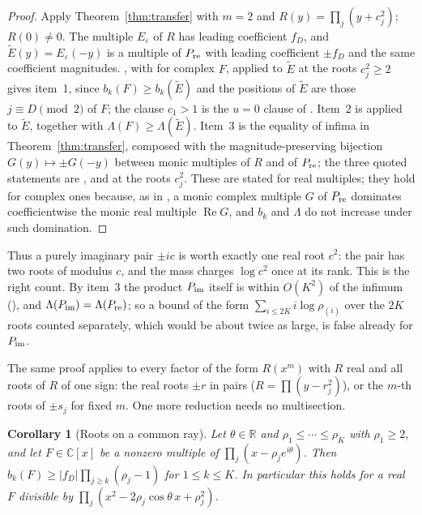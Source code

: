 \documentclass[11pt]{article}
\newtheorem{corollary}[theorem]{Corollary}
\newcommand{\R}{\mathbb R}
\begin{document}
\begin{proof}
Apply Theorem~\ref{thm:transfer} with $m=2$ and $R(y)=\prod_j(y+c_j^2)$;
$R(0)\ne0$.  The multiple $E_\varepsilon$ of $R$ has leading coefficient
$f_D$, and $\tilde E(y)=E_\varepsilon(-y)$ is a multiple of $P_{\rm re}$
with leading coefficient $\pm f_D$ and the same coefficient magnitudes.  \cite[Theorem~3.2]{coefficient-mass}, with \cite[Corollary~3.3]{coefficient-mass} for complex $F$, applied to
$\tilde E$ at the roots $c_j^2\ge2$ gives item~1, since
$b_k(F)\ge b_k(\tilde E)$ and the positions of $\tilde E$ are those
$j\equiv D\pmod 2$ of $F$; the clause $c_1>1$ is the $u=0$ clause of
\cite[Theorem~3.2]{coefficient-mass}.  Item~2 is \cite[Corollary~3.4]{coefficient-mass} applied to $\tilde E$, together with
$\Lambda(F)\ge\Lambda(\tilde E)$.  Item~3 is the equality of infima in
Theorem~\ref{thm:transfer}, composed with the magnitude-preserving
bijection $G(y)\mapsto\pm G(-y)$ between monic multiples of $R$ and of
$P_{\rm re}$; the three quoted statements are \cite[Corollary~4.3]{coefficient-mass},
\cite[Proposition~4.2]{coefficient-mass} and \cite[Proposition~4.4]{coefficient-mass} at
the roots $c_j^2$.  These are stated for real multiples; they hold for complex
ones because, as in \cite[Corollary~3.3]{coefficient-mass}, a monic complex
multiple $G$ of $P_{\rm re}$ dominates coefficientwise the monic real multiple
$\operatorname{Re}G$, and $b_k$ and $\Lambda$ do not increase under such
domination.
\end{proof}

Thus a purely imaginary pair $\pm ic$ is worth exactly one real root $c^2$:
the pair has two roots of modulus $c$, and the mass charges $\log c^2$ once
at its rank.  This is the right count.  By item~3 the product
$P_{\rm im}$ itself is within $O(K^2)$ of the infimum
(\cite[Corollary~3.7]{coefficient-mass}), and $\Lambda(P_{\rm im})=\Lambda(P_{\rm re})$; so a
bound of the form $\sum_{i\le2K}i\log\rho_{(i)}$ over the $2K$ roots
counted separately, which would be about twice as large, is false already
for $P_{\rm im}$.

The same proof applies to every factor of the form $R(x^m)$ with $R$ real
and all roots of $R$ of one sign: the real roots $\pm r$ in pairs
($R=\prod(y-r_j^2)$), or the $m$-th roots of $\pm s_j$ for fixed $m$.  One
more reduction needs no multisection.

\begin{corollary}[Roots on a common ray]\label{cor:ray}
Let $\theta\in\R$ and $\rho_1\le\cdots\le\rho_K$ with $\rho_1\ge2$, and let
$F\in\mathbb C[x]$ be a nonzero multiple of $\prod_j(x-\rho_je^{i\theta})$.  Then
$b_k(F)\ge|f_D|\prod_{j\ge k}(\rho_j-1)$ for $1\le k\le K$.  In
particular this holds for a real $F$ divisible by
$\prod_j(x^2-2\rho_j\cos\theta\,x+\rho_j^2)$.
\end{corollary}
\end{document}
